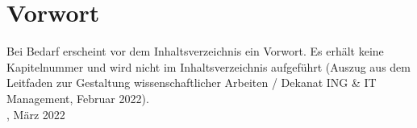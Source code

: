 \section*{Vorwort}
Bei Bedarf erscheint vor dem Inhaltsverzeichnis ein Vorwort. Es erhält keine Kapitelnummer und wird nicht im Inhaltsverzeichnis aufgeführt (Auszug aus dem Leitfaden zur Gestaltung wissenschaftlicher Arbeiten / Dekanat ING \& IT Management, Februar 2022).
\\[1cm]
{\myOrt}, März 2022

{\myAutor}